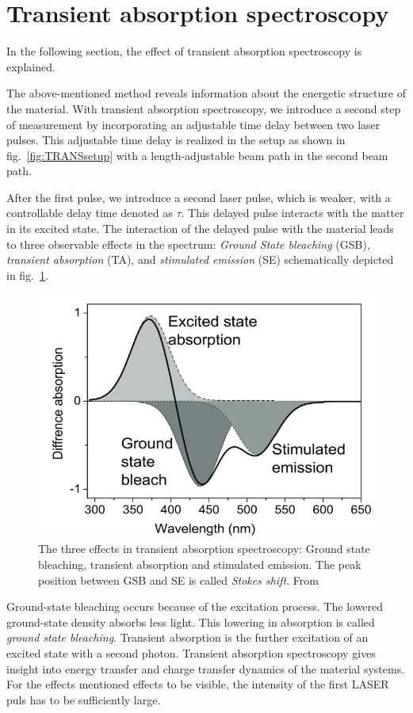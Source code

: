 \section{Transient absorption spectroscopy}
\label{sec:TheoTransAbs} 

In the following section, the effect of transient absorption spectroscopy is explained. 

The above-mentioned method reveals information about the energetic structure of the material. With transient absorption spectroscopy, we introduce a second step of measurement by incorporating an adjustable time delay between two laser pulses. This adjustable time delay is realized in the setup as shown in fig.~\ref{fig:TRANSsetup} with a length-adjustable beam path in the second beam path.
 
After the first pulse, we introduce a second laser pulse, which is weaker, with a controllable delay time denoted as $\tau$. This delayed pulse interacts with the matter in its excited state. The interaction of the delayed pulse with the material leads to three observable effects in the spectrum: \textit{Ground State bleaching} (GSB), \textit{transient absorption} (TA), and \textit{stimulated emission} (SE) schematically depicted in fig.~\ref{fig:GSBSETRA}. 
\begin{figure}[ht]
    \centering
    \includegraphics[width = 12cm]{Bilder/Grundlagen/GSBSETA.png}
    \caption{The three effects in transient absorption spectroscopy: Ground state bleaching, transient absorption and stimulated emission. The peak position between GSB and SE is called \textit{Stokes shift}. From \cite{5796fb6fae874c3fb73b57f57c942314}}
    \label{fig:GSBSETRA}
\end{figure}
Ground-state bleaching occurs because of the excitation process. The lowered ground-state density absorbs less light. This lowering in absorption is called \textit{ground state bleaching}. Transient absorption is the further excitation of an excited state with a second photon. 
Transient absorption spectroscopy gives insight into energy transfer and charge transfer dynamics of the material systems. For the effects mentioned effects to be visible, the intensity of the first LASER puls has to be 
sufficiently large.



